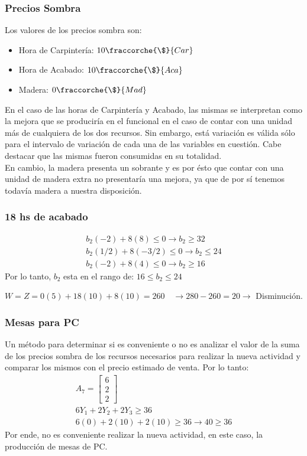 \begin{homeworkProblem}[1][Dakota]
\subsubsection{Precios Sombra}
Los valores de los precios sombra son:
\begin{itemize}
  \item Hora de Carpintería: $10 \fraccorche{\$}{Car}$
  \item Hora de Acabado: $10 \fraccorche{\$}{Aca}$
  \item Madera: $0 \fraccorche{\$}{Mad}$
\end{itemize}
En el caso de las horas de Carpintería y Acabado, las mismas se interpretan como la mejora que se produciría en el funcional en el caso de contar con una unidad más de cualquiera de los dos recursos.
Sin embargo, está variación es válida sólo para el intervalo de variación de cada una de las variables en cuestión. Cabe destacar que las mismas fueron consumidas en su totalidad.\\

En cambio, la madera presenta un sobrante y es por ésto que contar con una unidad de madera extra no presentaría una mejora, ya que de por sí tenemos todavía madera a nuestra disposición.
\subsubsection{18 hs de acabado}

\begin{align*}
  b_2(-2) + 8(8) \le 0 \rightarrow b_2 \ge 32 \\
  b_2(1/2) + 8(-3/2) \le 0 \rightarrow b_2 \le 24 \\
  b_2(-2) + 8(4) \le 0 \rightarrow b_2 \ge 16
\end{align*}
Por lo tanto, $b_2$ esta en el rango de: $16  \le b_2 \le 24$

$W = Z = 0(5) + 18(10) + 8(10) = 260 \quad \rightarrow 280-260 = 20 \rightarrow$ Disminución.

\subsubsection{Mesas para PC}
Un método para determinar si es conveniente o no es analizar el valor de la suma de los precios sombra de los recursos necesarios para realizar la nueva actividad y comparar los mismos con el precio estimado de venta. Por lo tanto:
\begin{align*}
  A_7 =
  \begin{bmatrix}
    6  \\ 2 \\ 2
  \end{bmatrix} \\
  6Y_1+2Y_2+2Y_3 \ge 36 \\
  6(0) + 2(10) + 2(10) \ge 36 \rightarrow 40 \ge 36
\end{align*}
Por ende, no es conveniente realizar la nueva actividad, en este caso, la producción de mesas de PC.



\end{homeworkProblem}
